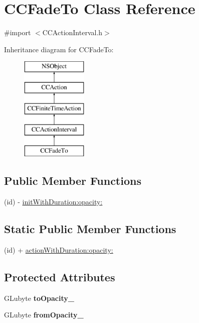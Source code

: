 \hypertarget{interface_c_c_fade_to}{\section{C\-C\-Fade\-To Class Reference}
\label{interface_c_c_fade_to}
}


{\ttfamily \#import $<$C\-C\-Action\-Interval.\-h$>$}

Inheritance diagram for C\-C\-Fade\-To\-:\begin{figure}[H]
\begin{center}
\leavevmode
\includegraphics[height=5.000000cm]{interface_c_c_fade_to}
\end{center}
\end{figure}
\subsection*{Public Member Functions}
\begin{DoxyCompactItemize}
\item 
(id) -\/ \hyperlink{interface_c_c_fade_to_a06730c12f4b1c74658ca081d74516bdb}{init\-With\-Duration\-:opacity\-:}
\end{DoxyCompactItemize}
\subsection*{Static Public Member Functions}
\begin{DoxyCompactItemize}
\item 
(id) + \hyperlink{interface_c_c_fade_to_a4b6e13aafb27f48a54fd74f4c0b342a2}{action\-With\-Duration\-:opacity\-:}
\end{DoxyCompactItemize}
\subsection*{Protected Attributes}
\begin{DoxyCompactItemize}
\item 
\hypertarget{interface_c_c_fade_to_add096aa4593893637f8f599d83b3b27e}{G\-Lubyte {\bfseries to\-Opacity\-\_\-}}\label{interface_c_c_fade_to_add096aa4593893637f8f599d83b3b27e}

\item 
\hypertarget{interface_c_c_fade_to_a18dc63d61fac7a30d7c513af9d6935cd}{G\-Lubyte {\bfseries from\-Opacity\-\_\-}}\label{interface_c_c_fade_to_a18dc63d61fac7a30d7c513af9d6935cd}

\end{DoxyCompactItemize}


